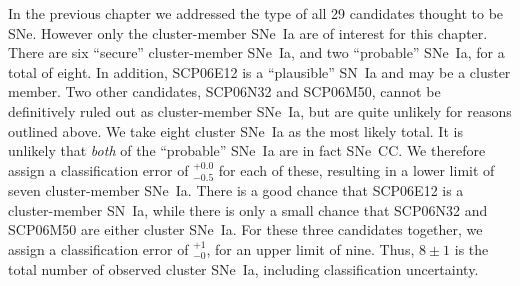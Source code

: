 In the previous chapter we addressed the type of all 29 candidates
thought to be SNe. However only the cluster-member SNe~Ia are of
interest for this chapter. There are six ``secure''
cluster-member SNe~Ia, and two ``probable'' SNe~Ia, for a total of
eight. In addition, SCP06E12 is a ``plausible'' SN~Ia and may be a
cluster member. Two other candidates, SCP06N32 and SCP06M50, cannot be
definitively ruled out as cluster-member SNe~Ia, but are quite
unlikely for reasons outlined above. We take eight cluster SNe~Ia as
the most likely total. It is unlikely that {\it both} of the
``probable'' SNe~Ia are in fact SNe~CC. We therefore assign a
classification error of $^{+0.0}_{-0.5}$ for each of these, resulting
in a lower limit of seven cluster-member SNe~Ia. There is a good
chance that SCP06E12 is a cluster-member SN~Ia, while there is only a
small chance that SCP06N32 and SCP06M50 are either cluster SNe~Ia. For
these three candidates together, we assign a classification error of
$^{+1}_{-0}$, for an upper limit of nine. Thus, $8 \pm 1$ is the total
number of observed cluster SNe~Ia, including classification uncertainty.
